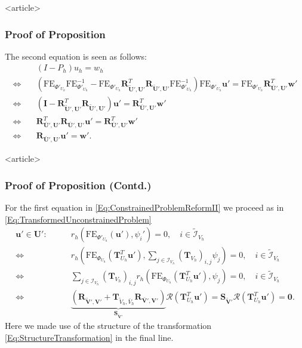 \begin{frame}<article>
\frametitle<presentation>{Proof of Proposition}
The second equation is seen as follows:
\begin{equation}\label{Eq:SideConditionCoefficient}
\begin{split}
&(I-P_h) u_h = w_h \\
\Leftrightarrow \quad & 
\left(\text{FE}_{\Phi'_{U_h}}\text{FE}_{\Phi'_{U_h}}^{-1}
- \text{FE}_{\Phi'_{U_h}}
\mathbf{R}^T_{\tilde{\mathbf{U}}',\mathbf{U}'}
\mathbf{R}_{\tilde{\mathbf{U}}',\mathbf{U}'} 
\text{FE}_{\Phi'_{U_h}}^{-1}\right)\text{FE}_{\Phi'_{U_h}}\mathbf{u}'
= \text{FE}_{\Phi'_{U_h}}
\mathbf{R}^T_{\bar{\mathbf{U}}',\mathbf{U}'} \mathbf{w}'\\
\Leftrightarrow \quad &
\left( \mathbf{I} - \mathbf{R}^T_{\tilde{\mathbf{U}}',\mathbf{U}'}
\mathbf{R}_{\tilde{\mathbf{U}}',\mathbf{U}'}\right) \mathbf{u}' =
\mathbf{R}^T_{\bar{\mathbf{U}}',\mathbf{U}'} \mathbf{w}' \\
\Leftrightarrow \quad &
\mathbf{R}^T_{\bar{\mathbf{U}}',\mathbf{U}'}
\mathbf{R}_{\bar{\mathbf{U}}',\mathbf{U}'} \mathbf{u}' =
\mathbf{R}^T_{\bar{\mathbf{U}}',\mathbf{U}'} \mathbf{w}'\\
\Leftrightarrow \quad &
\mathbf{R}_{\bar{\mathbf{U}}',\mathbf{U}'} \mathbf{u}' = \mathbf{w}' .
\end{split}
\end{equation}
\end{frame}

\begin{frame}<article>
\frametitle<presentation>{Proof of Proposition (Contd.)}
For the first equation in \eqref{Eq:ConstrainedProblemReformII} 
we proceed as in \eqref{Eq:TransformedUnconstrainedProblem}
\begin{equation}\label{Eq:TransformedConstrainedProblem2}
\begin{split}
\mathbf{u}'\in\mathbf{U}' : \qquad 
& r_h\left(\text{FE}_{\Phi'_{U_h}}(\mathbf{u}'),\psi_i'\right) = 0, \quad
i\in\tilde{\mathcal{I}}_{V_h}\\
\Leftrightarrow \  &
r_h\left(\text{FE}_{\Phi_{U_h}}(\mathbf{T}^T_{U_h}\mathbf{u}'),
\sum_{j\in\mathcal{I}_{V_h}}\left(\mathbf{T}_{V_h}\right)_{i,j}\psi_j\right) = 0, \quad
i\in\tilde{\mathcal{I}}_{V_h}\\
\Leftrightarrow \  &
\sum_{j\in\mathcal{I}_{V_h}} \left(\mathbf{T}_{V_h}\right)_{i,j} 
r_h\left(\text{FE}_{\Phi_{U_h}}(\mathbf{T}^T_{U_h}\mathbf{u}'),
\psi_j\right) = 0, \quad
i\in\tilde{\mathcal{I}}_{V_h}\\
\Leftrightarrow \  &
\underbrace{\left(\mathbf{R}_{\tilde{\mathbf{V}}',\mathbf{V}'} +
\mathbf{T}_{\tilde{V}_h,\bar{V}_h}\mathbf{R}_{\bar{\mathbf{V}}',\mathbf{V}'}
\right)}_{\mathbf{S}_{\tilde{\mathbf{V}}'}}\mathcal{R}\left(\mathbf{T}^T_{U_h}\mathbf{u}'\right)=
\mathbf{S}_{\tilde{\mathbf{V}}'} \mathcal{R}\left(\mathbf{T}^T_{U_h}\mathbf{u}'\right)
= \mathbf{0} .
\end{split}
\end{equation}
Here we made use of the structure of the transformation
\eqref{Eq:StructureTransformation} in the final line.
\end{frame}


